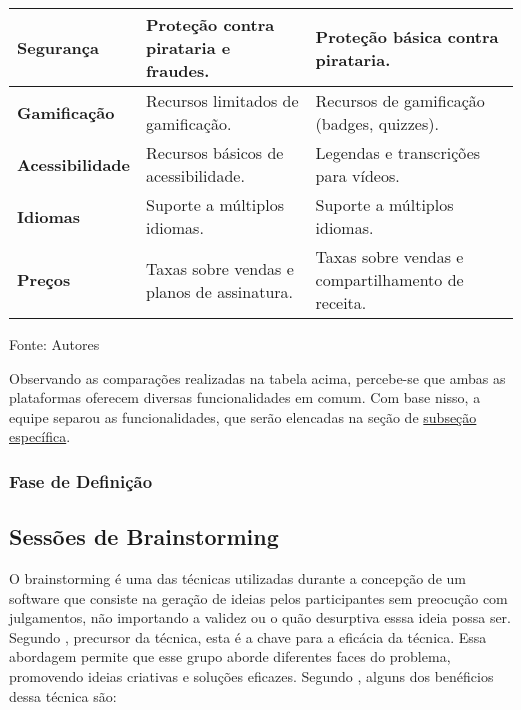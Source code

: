 \begin{table}[h]
\begin{tabular}{|p{5cm}|p{5cm}|p{5cm}|}
        \hline
        \textbf{Segurança} & Proteção contra pirataria e fraudes. & Proteção básica contra pirataria. \\
        \hline
        \textbf{Gamificação} & Recursos limitados de gamificação. & Recursos de gamificação (badges, quizzes). \\
        \hline
        \textbf{Acessibilidade} & Recursos básicos de acessibilidade. & Legendas e transcrições para vídeos. \\
        \hline
        \textbf{Idiomas} & Suporte a múltiplos idiomas. & Suporte a múltiplos idiomas. \\
        \hline
        \textbf{Preços} & Taxas sobre vendas e planos de assinatura. & Taxas sobre vendas e compartilhamento de receita. \\
        \hline
    \end{tabular}
    \label{tab:comparacao_hotmart_udemy}
    \vspace{5mm}
    {\footnotesize Fonte: Autores} 
\end{table}

Observando as comparações realizadas na tabela acima, percebe-se que ambas as plataformas oferecem diversas funcionalidades em comum. Com base nisso, a equipe separou as funcionalidades, que serão elencadas na seção de \hyperref[Priorização de requisitos:minha_subsecao]{subseção específica}.
\subsubsection{Fase de Definição}


\subsection{Sessões de Brainstorming}

O brainstorming é uma das técnicas utilizadas durante a concepção de um software que consiste na geração de ideias pelos participantes sem preocução com julgamentos, não importando a validez ou o quão desurptiva esssa ideia possa ser. Segundo \cite{osborn1953}, precursor da técnica, esta é a chave para a eficácia da técnica. 
Essa abordagem permite que esse grupo aborde diferentes faces do problema, promovendo ideias criativas e soluções eficazes. Segundo \cite{miro2025}, alguns dos benéficios dessa técnica são:

